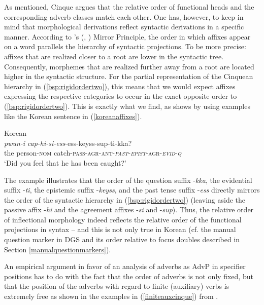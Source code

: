 \noindent As mentioned, Cinque argues that the relative order of functional heads and the corresponding adverb classes match each other. One has, however, to keep in mind that morphological derivations reflect syntactic derivations in a specific manner. According to \citeauthor{baker1985mirror}'s (\citeyear{baker1985mirror}, \citeyear{baker1988}) Mirror Principle, the order in which affixes appear on a word parallels the hierarchy of syntactic projections. To be more precise: affixes that are realized closer to a root are lower in the syntactic tree. Consequently, morphemes that are realized further away from a root are located higher in the syntactic structure. For the partial representation of the Cinquean hierarchy in (\ref{bsp:rigidordertwo}), this means that we would expect affixes expressing the respective categories to occur in the exact opposite order to (\ref{bsp:rigidordertwo}). This is exactly what we find, as \citet[53]{cinque1999adverbs} shows by using examples like the Korean sentence in (\ref{koreanaffixes}).

\begin{exe}
\ex Korean \citep[300]{sohn1994korean} \\  {\textit{pwun-i}} {\textit{cap-hi-si-ess}-ess-keyss-sup-ti-kka?}  \\
{the} {person-\textsc{nom}} {catch-\textsc{pass-agr-ant-\textit{past}-\textit{epist}-agr-\textit{evid}-\textit{q}}}  \\
\trans `Did you feel that he has been caught?' \label{koreanaffixes}
\end{exe}

\noindent The example illustrates that the order of the question suffix -\textit{kka}, the evidential suffix -\textit{ti}, the epistemic suffix -\textit{keyss}, and the past tense suffix -\textit{ess} directly mirrors the order of the syntactic hierarchy in (\ref{bsp:rigidordertwo}) (leaving aside the passive affix -\textit{hi} and the agreement affixes -\textit{si} and -\textit{sup}). Thus, the relative order of inflectional morphology indeed reflects the relative order of the functional projections in syntax -- and this is not only true in Korean (cf. the manual question marker in DGS and its order relative to focus doubles described in Section \ref{manualquestionmarkers}).

An empirical argument in favor of an analysis of adverbs as AdvP in specifier positions has to do with the fact that the order of adverbs is not only fixed, but that the position of the adverbs with regard to finite (auxiliary) verbs is extremely free as shown in the examples in (\ref{finiteauxcinque}) from \citet[49]{cinque1999adverbs}.

